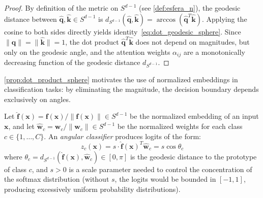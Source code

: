 \begin{proof}
By definition of the metric on $S^{d-1}$ (see \autoref{def:esfera_n}), the geodesic distance between $\hat{\mathbf{q}}, \hat{\mathbf{k}} \in S^{d-1}$ is $d_{S^{d-1}}(\hat{\mathbf{q}}, \hat{\mathbf{k}}) = \arccos(\hat{\mathbf{q}}^T \hat{\mathbf{k}})$. Applying the cosine to both sides directly yields identity~\eqref{eq:dot_geodesic_sphere}. Since $\|\hat{\mathbf{q}}\| = \|\hat{\mathbf{k}}\| = 1$, the dot product $\hat{\mathbf{q}}^T \hat{\mathbf{k}}$ does not depend on magnitudes, but only on the geodesic angle, and the attention weights $\alpha_{ij}$ are a monotonically decreasing function of the geodesic distance $d_{S^{d-1}}$.
\end{proof}

\autoref{prop:dot_product_sphere} motivates the use of normalized embeddings in classification tasks: by eliminating the magnitude, the decision boundary depends exclusively on angles.

\begin{definition}\label{def:clasificador_angular}
Let $\hat{\mathbf{f}}(\mathbf{x}) = \mathbf{f}(\mathbf{x})/\|\mathbf{f}(\mathbf{x})\| \in S^{d-1}$ be the normalized embedding of an input $\mathbf{x}$, and let $\hat{\mathbf{w}}_c = \mathbf{w}_c/\|\mathbf{w}_c\| \in S^{d-1}$ be the normalized weights for each class $c \in \{1, \ldots, C\}$. An \textit{angular classifier} \citep{wang2017normface} produces logits of the form:
\begin{equation}
z_c(\mathbf{x}) = s \cdot \hat{\mathbf{f}}(\mathbf{x})^T \hat{\mathbf{w}}_c = s \cos\theta_c
\label{eq:clasificador_angular}
\end{equation}
where $\theta_c = d_{S^{d-1}}(\hat{\mathbf{f}}(\mathbf{x}), \hat{\mathbf{w}}_c) \in [0, \pi]$ is the geodesic distance to the prototype of class $c$, and $s > 0$ is a scale parameter needed to control the concentration of the softmax distribution (without $s$, the logits would be bounded in $[-1, 1]$, producing excessively uniform probability distributions).
\end{definition}

